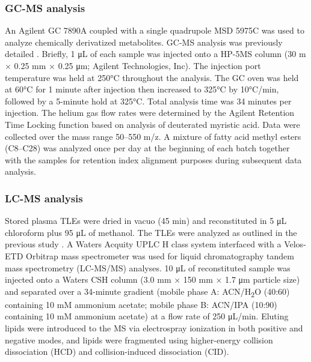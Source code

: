 \subsubsection{GC-MS analysis}
An Agilent GC 7890A coupled with a single quadrupole MSD 5975C was used to analyze chemically derivatized metabolites. GC-MS analysis was previously detailed \cite{webb-robertsonbj_metzto:StatisticalAnalysis2014}. Briefly, 1 μL of each sample was injected onto a HP-5MS column (30 m × 0.25 mm × 0.25 μm; Agilent Technologies, Inc). The injection port temperature was held at 250°C throughout the analysis. The GC oven was held at 60°C for 1 minute after injection then increased to 325°C by 10°C/min, followed by a 5-minute hold at 325°C. Total analysis time was 34 minutes per injection. The helium gas flow rates were determined by the Agilent Retention Time Locking function based on analysis of deuterated myristic acid. Data were collected over the mass range 50--550 m/z. A mixture of fatty acid methyl esters (C8--C28) was analyzed once per day at the beginning of each batch together with the samples for retention index alignment purposes during subsequent data analysis.

\subsubsection{LC-MS analysis}
Stored plasma TLEs were dried in vacuo (45 min) and reconstituted in 5 μL chloroform plus 95 μL of methanol. The TLEs were analyzed as outlined in the previous study \cite{kyleje_metzto:LIQUIDAnopen2017}. A Waters Acquity UPLC H class system interfaced with a Velos-ETD Orbitrap mass spectrometer was used for liquid chromatography tandem mass spectrometry (LC-MS/MS) analyses. 10 μL of reconstituted sample was injected onto a Waters CSH column (3.0 mm × 150 mm × 1.7 μm particle size) and separated over a 34-minute gradient (mobile phase A: ACN/H\textsubscript{2}O (40:60) containing 10 mM ammonium acetate; mobile phase B: ACN/IPA (10:90) containing 10 mM ammonium acetate) at a flow rate of 250 μL/min. Eluting lipids were introduced to the MS via electrospray ionization in both positive and negative modes, and lipids were fragmented using higher-energy collision dissociation (HCD) and collision-induced dissociation (CID).


